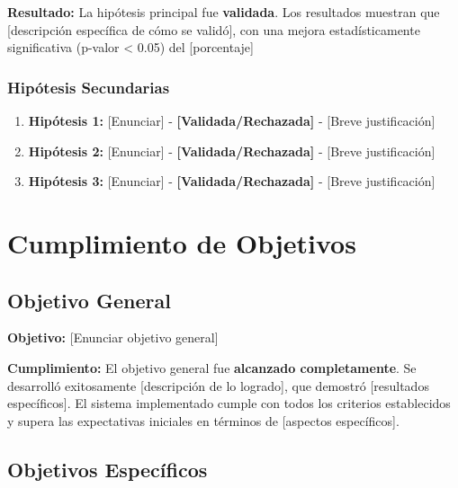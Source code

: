 \textbf{Resultado:} La hipótesis principal fue \textbf{validada}. Los resultados muestran que [descripción específica de cómo se validó], con una mejora estadísticamente significativa (p-valor < 0.05) del [porcentaje]%

\subsubsection{Hipótesis Secundarias}

\begin{enumerate}
    \item \textbf{Hipótesis 1:} [Enunciar] - \textbf{[Validada/Rechazada]} - [Breve justificación]
    \item \textbf{Hipótesis 2:} [Enunciar] - \textbf{[Validada/Rechazada]} - [Breve justificación]
    \item \textbf{Hipótesis 3:} [Enunciar] - \textbf{[Validada/Rechazada]} - [Breve justificación]
\end{enumerate}

\section{Cumplimiento de Objetivos}

\subsection{Objetivo General}

\textbf{Objetivo:} [Enunciar objetivo general]

\textbf{Cumplimiento:} El objetivo general fue \textbf{alcanzado completamente}. Se desarrolló exitosamente [descripción de lo logrado], que demostró [resultados específicos]. El sistema implementado cumple con todos los criterios establecidos y supera las expectativas iniciales en términos de [aspectos específicos].

\subsection{Objetivos Específicos}

